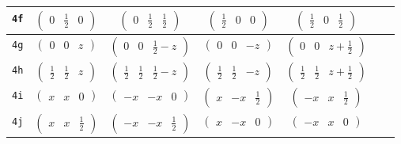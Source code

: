 \documentclass[fleqn,9pt,landscape]{jsarticle}
\begin{document}
\begin{center}
\begin{longtable}{ccccccc}
{\tt 4f} & $ \begin{pmatrix} 0 & \frac{1}{2} & 0 \end{pmatrix} $ & $ \begin{pmatrix} 0 & \frac{1}{2} & \frac{1}{2} \end{pmatrix} $ & $ \begin{pmatrix} \frac{1}{2} & 0 & 0 \end{pmatrix} $ & $ \begin{pmatrix} \frac{1}{2} & 0 & \frac{1}{2} \end{pmatrix} $ & $  $ & $  $ \\ \hline
{\tt 4g} & $ \begin{pmatrix} 0 & 0 & z \end{pmatrix} $ & $ \begin{pmatrix} 0 & 0 & \frac{1}{2} - z \end{pmatrix} $ & $ \begin{pmatrix} 0 & 0 & - z \end{pmatrix} $ & $ \begin{pmatrix} 0 & 0 & z + \frac{1}{2} \end{pmatrix} $ & $  $ & $  $ \\ \hline
{\tt 4h} & $ \begin{pmatrix} \frac{1}{2} & \frac{1}{2} & z \end{pmatrix} $ & $ \begin{pmatrix} \frac{1}{2} & \frac{1}{2} & \frac{1}{2} - z \end{pmatrix} $ & $ \begin{pmatrix} \frac{1}{2} & \frac{1}{2} & - z \end{pmatrix} $ & $ \begin{pmatrix} \frac{1}{2} & \frac{1}{2} & z + \frac{1}{2} \end{pmatrix} $ & $  $ & $  $ \\ \hline
{\tt 4i} & $ \begin{pmatrix} x & x & 0 \end{pmatrix} $ & $ \begin{pmatrix} - x & - x & 0 \end{pmatrix} $ & $ \begin{pmatrix} x & - x & \frac{1}{2} \end{pmatrix} $ & $ \begin{pmatrix} - x & x & \frac{1}{2} \end{pmatrix} $ & $  $ & $  $ \\ \hline
{\tt 4j} & $ \begin{pmatrix} x & x & \frac{1}{2} \end{pmatrix} $ & $ \begin{pmatrix} - x & - x & \frac{1}{2} \end{pmatrix} $ & $ \begin{pmatrix} x & - x & 0 \end{pmatrix} $ & $ \begin{pmatrix} - x & x & 0 \end{pmatrix} $ & $  $ & $  $ \\ \hline

\end{longtable}
\end{center}
\end{document}
